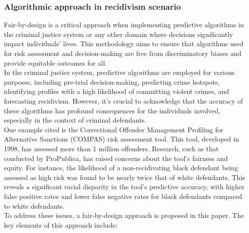 \documentclass{article}
\begin{document}
\subsubsection{Algorithmic approach in recidivism scenario}
Fair-by-design is a critical approach when implementing predictive algorithms in the criminal justice system or any other domain where decisions significantly impact individuals' lives. This methodology aims to ensure that algorithms used for risk assessment and decision-making are free from discriminatory biases and provide equitable outcomes for all. \\
In the criminal justice system, predictive algorithms are employed for various purposes, including pre-trial decision-making, predicting crime hotspots, identifying profiles with a high likelihood of committing violent crimes, and forecasting recidivism. However, it's crucial to acknowledge that the accuracy of these algorithms has profound consequences for the individuals involved, especially in the context of criminal defendants. \\
One example cited is the Correctional Offender Management Profiling for Alternative Sanctions (COMPAS) risk assessment tool. This tool, developed in 1998, has assessed more than 1 million offenders. Research, such as that conducted by ProPublica, has raised concerns about the tool's fairness and equity. For instance, the likelihood of a non-recidivating black defendant being assessed as high risk was found to be nearly twice that of white defendants. This reveals a significant racial disparity in the tool's predictive accuracy, with higher false positive rates and lower false negative rates for black defendants compared to white defendants.\\
To address these issues, a fair-by-design approach is proposed in this paper. The key elements of this approach include:
\end{document}

